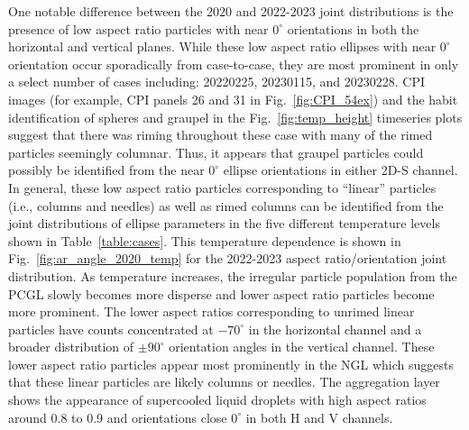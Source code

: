 \documentclass[amt, manuscript]{copernicus}
\begin{document}



One notable difference between the 2020 and 2022-2023 joint distributions is the presence of low aspect ratio particles with near $0^{\circ}$ orientations in both the horizontal and vertical planes. While these low aspect ratio ellipses with near $0^{\circ}$ orientation occur sporadically from case-to-case, they are most prominent in only a select number of cases including: 20220225, 20230115, and 20230228. CPI images (for example, CPI panels 26 and 31 in Fig.~\ref{fig:CPI_54ex}) and the habit identification of spheres and graupel in the Fig.~\ref{fig:temp_height} timeseries plots suggest that there was riming throughout these case with many of the rimed particles seemingly columnar. Thus, it appears that graupel particles could possibly be identified from the near $0^{\circ}$ ellipse orientations in either 2D-S channel. In general, these low aspect ratio particles corresponding to ``linear'' particles (i.e., columns and needles) as well as rimed columns can be identified from the joint distributions  of ellipse parameters in the five different temperature levels shown in Table~\ref{table:cases}. This temperature dependence is shown in Fig.~\ref{fig:ar_angle_2020_temp} for the 2022-2023 aspect ratio/orientation joint distribution. As temperature increases, the irregular particle population from the PCGL slowly becomes more disperse and lower aspect ratio particles become more prominent. The lower aspect ratios corresponding to unrimed linear particles have counts concentrated at $-70^{\circ}$ in the horizontal channel and a broader distribution of $\pm 90^{\circ}$ orientation angles in the vertical channel. These lower aspect ratio particles appear most prominently in the NGL which suggests that these linear particles are likely columns or needles. The aggregation layer shows the appearance of supercooled liquid droplets with high aspect ratios around 0.8 to 0.9 and orientations close $0^{\circ}$ in both H and V channels. 
\end{document}
